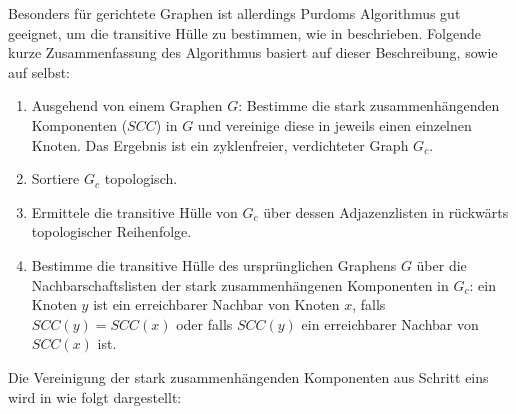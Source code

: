 Besonders für gerichtete Graphen ist allerdings Purdoms Algorithmus gut geeignet, um die transitive Hülle zu bestimmen, wie in \cite[Seite 77]{dar1993augmenting} beschrieben. Folgende kurze Zusammenfassung des Algorithmus basiert auf dieser Beschreibung, sowie auf \cite{purdom1970transitive} selbst: 

\begin{enumerate}
\item Ausgehend von einem Graphen $G$: Bestimme die stark zusammenhängenden Komponenten ($SCC$) in $G$ und vereinige diese in jeweils einen einzelnen Knoten. Das Ergebnis ist ein zyklenfreier, verdichteter Graph $G_c$.  %
\item Sortiere $G_c$ topologisch. %
\item Ermittele die transitive Hülle von $G_c$ über dessen Adjazenzlisten in rückwärts topologischer Reihenfolge. %
\item Bestimme die transitive Hülle des ursprünglichen Graphens $G$ über die Nachbarschaftslisten der stark zusammenhängenen Komponenten in $G_c$: ein Knoten $y$ ist ein erreichbarer Nachbar von Knoten $x$, falls $SCC(y) = SCC(x)$ oder falls $SCC(y)$ ein erreichbarer Nachbar von $SCC(x)$ ist. %
\end{enumerate}

Die Vereinigung der stark zusammenhängenden Komponenten aus Schritt eins wird in \cite{purdom1970transitive} wie folgt dargestellt: 


